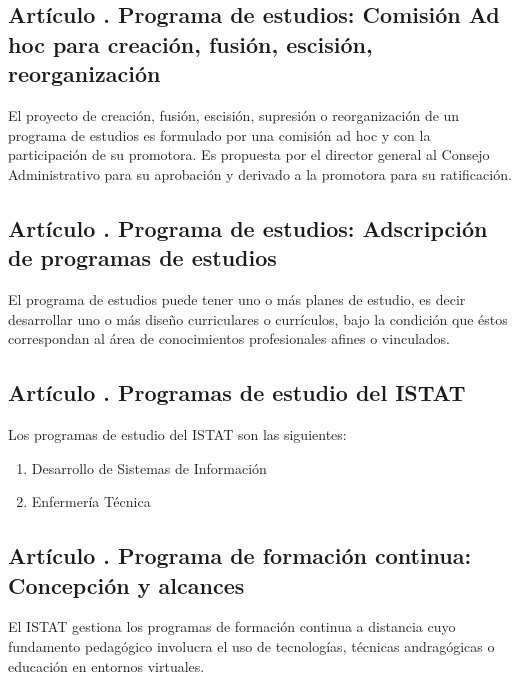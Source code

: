 \subsection{Artículo . Programa de estudios: Comisión Ad hoc para creación, fusión, escisión, reorganización}
\addtocounter{ns}{1}
El proyecto de creación, fusión, escisión, supresión o reorganización de un programa de estudios es formulado por una comisión ad hoc y con la participación de su promotora. Es propuesta por el director general al Consejo Administrativo para su aprobación y derivado a la promotora para su ratificación. 
\subsection{Artículo . Programa de estudios: Adscripción de programas de estudios}
\addtocounter{ns}{1}
El programa de estudios puede tener uno o más planes de estudio, es decir desarrollar uno o más diseño curriculares o currículos, bajo la condición que éstos correspondan al área de conocimientos profesionales afines o vinculados. 
\subsection{Artículo . Programas de estudio del ISTAT}
\addtocounter{ns}{1}
Los programas de estudio del ISTAT son las siguientes: 
\begin{enumerate}
\item Desarrollo de Sistemas de Información
\item Enfermería Técnica
\end{enumerate}
\subsection{Artículo . Programa de formación continua: Concepción y alcances}
\addtocounter{ns}{1}
El ISTAT gestiona los programas de formación continua a distancia cuyo fundamento pedagógico involucra el uso de tecnologías, técnicas andragógicas o educación en entornos virtuales.
